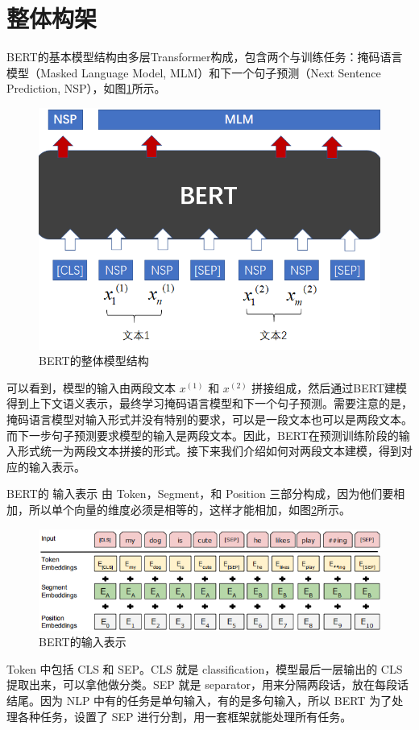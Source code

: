 \documentclass[]{article}
\begin{document}
\section{整体构架}
BERT的基本模型结构由多层Transformer构成，包含两个与训练任务：掩码语言模型（Masked Language Model, MLM）和下一个句子预测（Next Sentence Prediction, NSP），如图\ref{fig:001}所示。

\begin{figure}[htbp]
	\centering
	\includegraphics[width=0.6\linewidth]{figures/001}
	\caption{BERT的整体模型结构}
	\label{fig:001}
\end{figure}

可以看到，模型的输入由两段文本 $x^{(1)}$ 和 $x^{(2)}$ 拼接组成，然后通过BERT建模得到上下文语义表示，最终学习掩码语言模型和下一个句子预测。需要注意的是，掩码语言模型对输入形式并没有特别的要求，可以是一段文本也可以是两段文本。而下一步句子预测要求模型的输入是两段文本。因此，BERT在预测训练阶段的输入形式统一为两段文本拼接的形式。接下来我们介绍如何对两段文本建模，得到对应的输入表示。

BERT的 输入表示 由 Token，Segment，和 Position 三部分构成，因为他们要相加，所以单个向量的维度必须是相等的，这样才能相加，如图\ref{fig:002}所示。

\begin{figure}[htbp]
	\centering
	\includegraphics[width=0.6\linewidth]{figures/002}
	\caption{BERT的输入表示}
	\label{fig:002}
\end{figure}

Token 中包括 CLS 和 SEP。CLS 就是 classification，模型最后一层输出的 CLS 提取出来，可以拿他做分类。SEP 就是 separator，用来分隔两段话，放在每段话结尾。因为 NLP 中有的任务是单句输入，有的是多句输入，所以 BERT 为了处理各种任务，设置了 SEP 进行分割，用一套框架就能处理所有任务。
\end{document}
